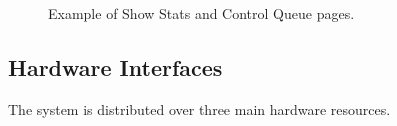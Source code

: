 \begin{figure}[H]
	\centering     %
	\caption{Example of Show Stats and Control Queue pages.}
\end{figure}

\subsection{Hardware Interfaces}

The system is distributed over three main hardware resources.

